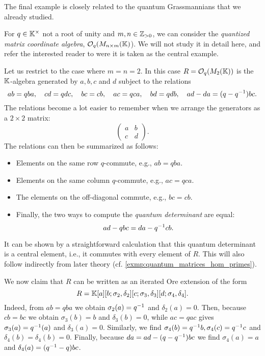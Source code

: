 The final example is closely related to the quantum Grassmannians that we already
studied.
\begin{example}\label{exmp:quantum_matrices}
	For $q \in \mathbb{K}^\times$  not a root of unity and $m, n \in \mathbb{Z}_{> 0}$, we can consider the \emph{quantized matrix coordinate algebra}, $\mathcal{O}_q(M_{n \times m}(\mathbb{K})$). We will not study it in detail here, and refer the interested reader to \cite{GoodearlYakimov2017QCA} were it is taken as the central example.

	Let us restrict to the case where $m = n = 2$. In this case $R = \mathcal{O}_q(M_2(\mathbb{K}))$ is
	the $\mathbb{K}$-algebra generated by $a,b,c$ and $d$ subject to the relations
	\begin{equation*}
		ab =qba, \quad cd = qdc, \quad bc = cb, \quad ac = qca, \quad bd = qdb, \quad ad - da = (q-q^{-1})bc.
	\end{equation*}
	The relations become a lot easier to remember when we arrange the generators as a $2
		\times 2$ matrix:
	\begin{equation*}
		\begin{pmatrix}
			a & b \\
			c & d
		\end{pmatrix}.
	\end{equation*}
	The relations can then be summarized as follows:
	\begin{itemize}
		\item Elements on the same row $q$-commute, e.g., $ab = qba$.
		\item Elements on the same column $q$-commute, e.g., $ac = qca$.
		\item The elements on the off-diagonal commute, e.g., $bc = cb$.
		\item Finally, the two ways to compute the \emph{quantum determinant} are equal:
		      \begin{equation*}
			      ad - qbc = da -q^{-1} cb.
		      \end{equation*}
	\end{itemize}
	It can be shown by a straightforward calculation that this quantum determinant is a
	central element, i.e., it commutes with every element of $R$. This will also follow
	indirectly from later theory (cf. \cref{exmp:quantum_matrices_hom_primes}).

	We now claim that $R$ can be written as an iterated Ore extension of the form
	\begin{equation*}
		R = \mathbb{K}[a][b; \sigma_2, \delta_2][c; \sigma_3, \delta_3][d; \sigma_4, \delta_4].
	\end{equation*}
	Indeed, from $ab = qba$ we obtain $\sigma_2(a) = q^{-1}$ and $\delta_2(a) = 0$. Then,
	because $cb = bc$ we obtain $\sigma_3(b) = b$ and $\delta_3(b) = 0$, while $ac = qac$
	gives $\sigma_3(a) = q^{-1}(a)$ and $\delta_3(a) = 0$. Similarly, we find $\sigma_4(b) =
		q^{-1} b, \sigma_4(c) = q^{-1} c$ and $\delta_4(b) = \delta_4(b) = 0$. Finally, because
	$da = ad - (q - q^{-1})bc$ we find $\sigma_4(a) = a$ and $\delta_4(a) = (q^{-1} - q)bc$.


\end{example}
